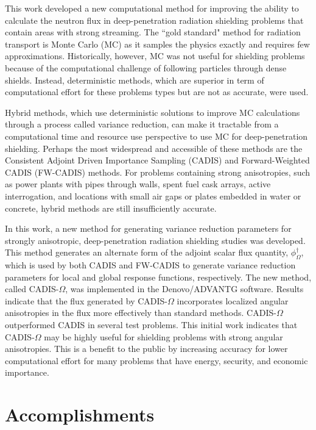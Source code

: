 \documentclass[12pt]{article}
\begin{document}
This work developed a new computational method for improving the ability to calculate the neutron flux in deep-penetration radiation shielding problems that contain areas with strong streaming. The ``gold standard" method for radiation transport is Monte Carlo (MC) as it samples the physics exactly and requires few approximations. Historically, however, MC was not useful for shielding problems because of the computational challenge of following particles through dense shields. Instead, deterministic methods, which are superior in term of computational effort for these problems types but are not as accurate, were used.

Hybrid methods, which use deterministic solutions to improve MC calculations through a process called variance reduction, can make it tractable from a computational time and resource use perspective to use MC for deep-penetration shielding. Perhaps the most widespread and accessible of these methods are the Consistent Adjoint Driven Importance Sampling (CADIS) and Forward-Weighted CADIS (FW-CADIS) methods. For problems containing strong anisotropies, such as power plants with pipes through walls, spent fuel cask arrays, active interrogation, and locations with small air gaps or plates embedded in water or concrete, hybrid methods are still insufficiently accurate. 

In this work, a new method for generating variance reduction parameters for strongly anisotropic, deep-penetration radiation shielding studies was developed. This method generates an alternate form of the adjoint scalar flux quantity, $\phi^{\dagger}_{\Omega}$, which is used by both CADIS and FW-CADIS to generate variance reduction parameters for local and global response functions, respectively. The new method, called CADIS-$\Omega$, was implemented in the Denovo/ADVANTG software. Results indicate that the flux generated by CADIS-$\Omega$ incorporates localized angular anisotropies in the flux more effectively than standard methods. CADIS-$\Omega$ outperformed CADIS in several test problems. This initial work indicates that CADIS-$\Omega$ may be highly useful for shielding problems with strong angular anisotropies. This is a benefit to the public by increasing accuracy for lower computational effort for many problems that have energy, security, and economic importance. 

\clearpage


\section{Accomplishments}
\label{sect::accomplishments}
\end{document}
